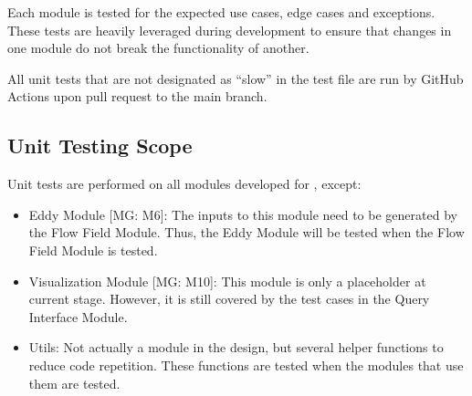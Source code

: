 \documentclass[12pt, titlepage]{article}
\begin{document}
Each module is tested for the expected use cases, edge cases and exceptions. These tests are heavily leveraged during development to ensure that changes in one module do not break the functionality of another.

All unit tests that are not designated as ``slow'' in the test file are run by GitHub Actions upon pull request to the main branch.




\subsection{Unit Testing Scope}

Unit tests are performed on all modules developed for \progname{}, except:
\begin{itemize}
  \item Eddy Module [MG: M6]: The inputs to this module need to be generated by the Flow Field Module. Thus, the Eddy Module will be tested when the Flow Field Module is tested.
  \item Visualization Module [MG: M10]: This module is only a placeholder at current stage. However, it is still covered by the test cases in the Query Interface Module.
  \item Utils: Not actually a module in the design, but several helper functions to reduce code repetition. These functions are tested when the modules that use them are tested.
\end{itemize} 

\end{document}
